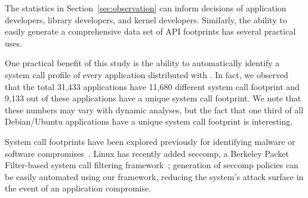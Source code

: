\label{sec:syspop:analysis}

The statistics in Section~\ref{sec:observation} can inform decisions of application developers, library developers,
and kernel developers.  Similarly, the ability to easily generate a comprehensive data set of API footprints
has several practical uses.



One practical benefit of this study is the ability to automatically identify a system call profile of
every application distributed with \osdist{}. In fact, we observed that the total 31,433 applications 
have 11,680 different system call footprint and 9,133 out of these applications have a unique system call footprint.
We note that these numbers may vary with dynamic analyses, but the fact that one third of all Debian/Ubuntu applications
have a unique system call footprint is interesting.

System call footprints have been explored previously for identifying malware or software compromises~\citep{policy-extraction}. %
Linux has recently added seccomp, a Berkeley Packet Filter-based system call filtering framework~\citep{seccomp};
generation of seccomp policies can be easily automated using our framework,
reducing the system's attack surface in the event of an application compromise.



